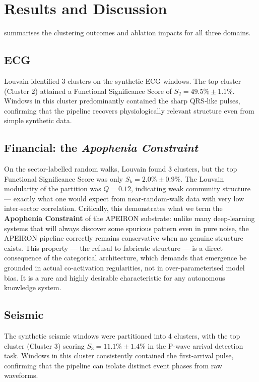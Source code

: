 \section{Results and Discussion}\label{sec:results}

 summarises the clustering outcomes and ablation impacts for all three domains.

\begin{table}[htbp]
\centering
\caption{Clustering results and functional significance (Functional Significance Score $S_k$) across three synthetic domain‑representative datasets.}
\label{tab:results}

\end{table}

\subsection{ECG}
Louvain identified 3 clusters on the synthetic ECG windows.
The top cluster (Cluster 2) attained a Functional Significance Score of $S_2 = 49.5\% \pm 1.1\%$.
Windows in this cluster predominantly contained the sharp QRS‑like pulses, confirming that the pipeline recovers physiologically relevant structure even from simple synthetic data.

\subsection{Financial: the \emph{Apophenia Constraint}}
On the sector‑labelled random walks, Louvain found 3 clusters, but the top Functional Significance Score was only $S_k = 2.0\% \pm 0.9\%$.
The Louvain modularity of the partition was $Q = 0.12$, indicating weak community structure — exactly what one would expect from near‑random‑walk data with very low inter‑sector correlation.
Critically, this demonstrates what we term the \textbf{Apophenia Constraint} of the APEIRON substrate: unlike many deep‑learning systems that will always discover some spurious pattern even in pure noise, the APEIRON pipeline correctly remains conservative when no genuine structure exists.
This property — the refusal to fabricate structure — is a direct consequence of the categorical architecture, which demands that emergence be grounded in actual co‑activation regularities, not in over‑parameterised model bias.
It is a rare and highly desirable characteristic for any autonomous knowledge system.

\subsection{Seismic}
The synthetic seismic windows were partitioned into 4 clusters, with the top cluster (Cluster 3) scoring $S_3 = 11.1\% \pm 1.4\%$ in the P‑wave arrival detection task.
Windows in this cluster consistently contained the first‑arrival pulse, confirming that the pipeline can isolate distinct event phases from raw waveforms.

